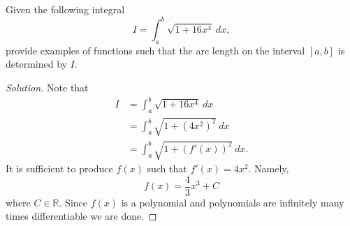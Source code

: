 \documentclass[compacto,10pt,comentarios]{aleph-notas}
\begin{document}
\begin{ejer}
    Given the following integral
    $$
        I = \int_{a}^{b} \sqrt{1 + 16x^{4}} ~ dx,
    $$
    provide examples of functions such that the arc length on the interval $[a, b]$ is determined by $I$.
\end{ejer}
\begin{proof}[Solution]
    Note that
    \begin{align*}
        I & = \int_{a}^{b} \sqrt{1 + 16x^{4}} ~ dx \\
        & = \int_{a}^{b} \sqrt{1 + (4x^{2})^{2}} ~ dx \\
        & = \int_{a}^{b} \sqrt{1 + (f'(x))^{2}} ~ dx .
    \end{align*}
    It is sufficient to produce $f(x)$ such that $f'(x) = 4x^{2}$. Namely,
    $$
        f(x) = \frac{4}{3} x ^{3} + C
    $$
    where $C \in \mathbb{R}$. Since $f(x)$ is a polynomial and polynomials are infinitely many times differentiable we are done. 
\end{proof}
\end{document}

